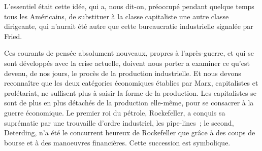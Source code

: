 \documentclass[french,twoside]{book} %
\begin{document}
L'essentiel était cette idée, qui a, nous dit-on, préoccupé pendant quelque temps tous les Américains, de substituer à la classe capitaliste une autre classe dirigeante, qui n'aurait été autre que cette bureaucratie industrielle signalée par Fried.\par
Ces courants de pensée absolument nouveaux, propres à l'après-guerre, et qui se sont développés avec la crise actuelle, doivent nous porter a examiner ce qu'est devenu, de nos jours, le procès de la production industrielle. Et nous devons reconnaître que les deux catégories économiques établies par Marx, capitalistes et prolétariat, ne suffisent plus à saisir la forme de la production. Les capitalistes se sont de plus en plus détachés de la production elle-même, pour se consacrer à la guerre économique. Le premier roi du pétrole, Rockefeller, a conquis sa suprématie par une trouvaille d'ordre industriel, les pipe-lines ; le second, Deterding, n'a été le concurrent heureux de Rockefeller que grâce à des coups de bourse et à des manoeuvres financières. Cette succession est symbolique.\par
\end{document}
